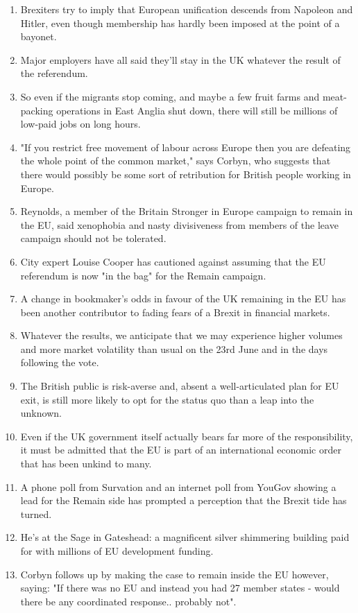 \documentclass[fleqn,moreauthors,10pt]{ds_report}
\begin{document}
\begin{enumerate}
    \item Brexiters try to imply that European unification descends from Napoleon and Hitler, even though membership has hardly been imposed at the point of a bayonet.
    \item Major employers have all said they'll stay in the UK whatever the result of the referendum.
    \item So even if the migrants stop coming, and maybe a few fruit farms and meat-packing operations in East Anglia shut down, there will still be millions of low-paid jobs on long hours.
    \item "If you restrict free movement of labour across Europe then you are defeating the whole point of the common market," says Corbyn, who suggests that there would possibly be some sort of retribution for British people working in Europe.
    \item Reynolds, a member of the Britain Stronger in Europe campaign to remain in the EU, said xenophobia and nasty divisiveness from members of the leave campaign should not be tolerated.
    \item City expert Louise Cooper has cautioned against assuming that the EU referendum is now "in the bag" for the Remain campaign.
    \item A change in bookmaker's odds in favour of the UK remaining in the EU has been another contributor to fading fears of a Brexit in financial markets.
    \item Whatever the results, we anticipate that we may experience higher volumes and more market volatility than usual on the 23rd June and in the days following the vote.
    \item The British public is risk-averse and, absent a well-articulated plan for EU exit, is still more likely to opt for the status quo than a leap into the unknown.
    \item Even if the UK government itself actually bears far more of the responsibility, it must be admitted that the EU is part of an international economic order that has been unkind to many.
    \item A phone poll from Survation and an internet poll from YouGov showing a lead for the Remain side has prompted a perception that the Brexit tide has turned.
    \item He's at the Sage in Gateshead: a magnificent silver shimmering building paid for with millions of  EU	development funding.
    \item Corbyn follows up by making the case to remain inside the EU however, saying: "If there was no EU and instead you had 27 member states - would there be any coordinated response.. probably not".

\end{enumerate}
\end{document}
